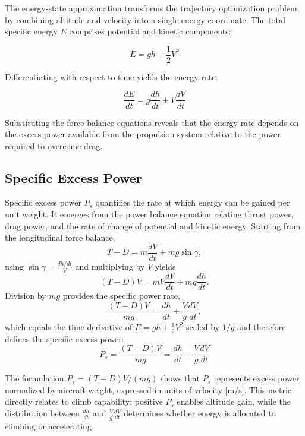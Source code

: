 The energy-state approximation transforms the trajectory optimization problem by combining altitude and velocity into a single energy coordinate. The total specific energy $E$ comprises potential and kinetic components:

\begin{equation}
E = gh + \frac{1}{2}V^2
\end{equation}

Differentiating with respect to time yields the energy rate:

\begin{equation}
\frac{dE}{dt} = g\frac{dh}{dt} + V\frac{dV}{dt}
\end{equation}

Substituting the force balance equations reveals that the energy rate depends on the excess power available from the propulsion system relative to the power required to overcome drag.

\subsection{Specific Excess Power}

Specific excess power $P_s$ quantifies the rate at which energy can be gained per unit weight. It emerges from the power balance equation relating thrust power, drag power, and the rate of change of potential and kinetic energy. Starting from the longitudinal force balance,
\begin{equation}
T - D = m\frac{dV}{dt} + mg\sin\gamma,
\end{equation}
using $\sin\gamma = \frac{dh/dt}{V}$ and multiplying by $V$ yields
\begin{equation}
(T-D)V = mV\frac{dV}{dt} + mg\frac{dh}{dt}.
\end{equation}
Division by $mg$ provides the specific power rate,
\begin{equation}
\frac{(T-D)V}{mg} = \frac{dh}{dt} + \frac{V}{g}\frac{dV}{dt},
\end{equation}
which equals the time derivative of $E = gh + \tfrac{1}{2}V^2$ scaled by $1/g$ and therefore defines the specific excess power:
\begin{equation}
P_s = \frac{(T-D)V}{mg} = \frac{dh}{dt} + \frac{V}{g}\frac{dV}{dt}
\end{equation}

The formulation $P_s = (T-D)V/(mg)$ shows that $P_s$ represents excess power normalized by aircraft weight, expressed in units of velocity [m/s]. This metric directly relates to climb capability: positive $P_s$ enables altitude gain, while the distribution between $\frac{dh}{dt}$ and $\frac{V}{g}\frac{dV}{dt}$ determines whether energy is allocated to climbing or accelerating.


